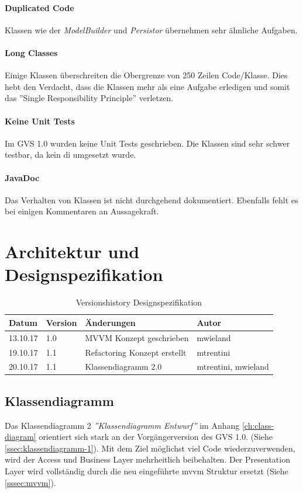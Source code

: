 \documentclass[11pt,a4paper,english,oneside]{book}
\numberwithin{equation}{chapter}
\begin{document}
	\subsubsection{Duplicated Code}
	Klassen wie der \textit{ModelBuilder} und \textit{Persistor} übernehmen sehr ähnliche Aufgaben.
	
	\subsubsection{Long Classes}
	Einige Klassen überschreiten die Obergrenze von 250 Zeilen Code/Klasse. Dies hebt den Verdacht, dass die Klassen mehr als eine Aufgabe erledigen und somit das ''Single Responsibility Principle'' verletzen.
	
	\subsubsection{Keine Unit Tests} Im GVS 1.0 wurden keine Unit Tests geschrieben. Die Klassen sind sehr schwer testbar, da kein \gls{di} umgesetzt wurde.
	
	\subsubsection{JavaDoc}
	Das Verhalten von Klassen ist nicht durchgehend dokumentiert.  Ebenfalls fehlt es bei einigen Kommentaren an Aussagekraft.	

		
	\chapter{Architektur und Designspezifikation}
	\label{ch:design-spec}
	
	\begin{table}[h!]
		\centering
		\begin{tabularx}{\linewidth}{l l X l}
			\toprule 
			Datum & Version & Änderungen & Autor \\
			\midrule
			13.10.17 & 1.0 & MVVM Konzept geschrieben & mwieland \\
			19.10.17 & 1.1 & Refactoring Konzept erstellt & mtrentini \\
			20.10.17 & 1.1 & Klassendiagramm 2.0 & mtrentini, mwieland \\
			\bottomrule 
		\end{tabularx} 
		\caption{Versionshistory Designspezifikation} 
	\end{table}
	
	\section{Klassendiagramm} \label{sec:class-diagram}
	Das Klassendiagramm 2 \textit{''Klassendiagramm Entwurf''} im Anhang \ref{ch:class-diagram} orientiert sich stark an der Vorgängerversion des GVS 1.0. (Siehe \ref{ssec:klassendiagramm-1}). Mit dem Ziel möglichst viel Code wiederzuverwenden, wird der Access und Business Layer mehrheitlich beibehalten. Der Presentation Layer wird vollständig durch die neu eingeführte \gls{mvvm} Struktur ersetzt (Siehe \ref{sssec:mvvm}).
	
\end{document}
